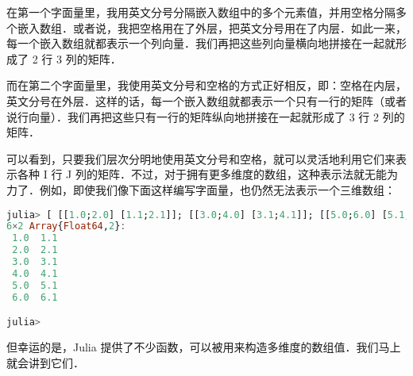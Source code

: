 在第一个字面量里，我用英文分号分隔嵌入数组中的多个元素值，并用空格分隔多个嵌入数组．或者说，我把空格用在了外层，把英文分号用在了内层．如此一来，每一个嵌入数组就都表示一个列向量．我们再把这些列向量横向地拼接在一起就形成了 2 行 3 列的矩阵．

而在第二个字面量里，我使用英文分号和空格的方式正好相反，即：空格在内层，英文分号在外层．这样的话，每一个嵌入数组就都表示一个只有一行的矩阵（或者说行向量）．我们再把这些只有一行的矩阵纵向地拼接在一起就形成了 3 行 2 列的矩阵．

可以看到，只要我们层次分明地使用英文分号和空格，就可以灵活地利用它们来表示各种 I 行 J 列的矩阵．不过，对于拥有更多维度的数组，这种表示法就无能为力了．例如，即使我们像下面这样编写字面量，也仍然无法表示一个三维数组：

\begin{lstlisting}[language=julia]
julia> [ [[1.0;2.0] [1.1;2.1]]; [[3.0;4.0] [3.1;4.1]]; [[5.0;6.0] [5.1;6.1]] ]
6×2 Array{Float64,2}:
 1.0  1.1
 2.0  2.1
 3.0  3.1
 4.0  4.1
 5.0  5.1
 6.0  6.1

julia> 
\end{lstlisting}

但幸运的是，Julia 提供了不少函数，可以被用来构造多维度的数组值．我们马上就会讲到它们．
